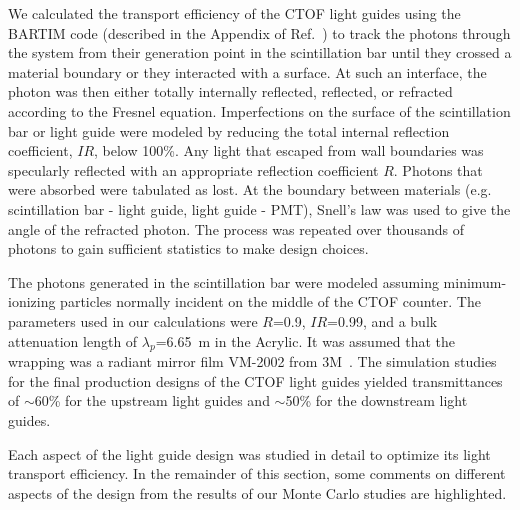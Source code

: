 \documentclass{elsart}
\begin{document}
We calculated the transport efficiency of the CTOF light guides using the BARTIM code
(described in the Appendix of Ref.~\cite{mutch}) to track the photons through the system
from their generation point in the scintillation bar until they crossed a material boundary
or they interacted with a surface. At such an interface, the photon was then either totally 
internally reflected, reflected, or refracted according to the Fresnel equation. Imperfections 
on the surface of the scintillation bar or light guide were modeled by reducing the total 
internal reflection coefficient, $IR$, below 100\%. Any light that escaped from wall boundaries 
was specularly reflected with an appropriate reflection coefficient $R$. Photons that were 
absorbed were tabulated as lost. At the boundary between materials (e.g. scintillation bar - 
light guide, light guide - PMT), Snell's law was used to give the angle of the refracted 
photon. The process was repeated over thousands of photons to gain sufficient statistics to 
make design choices.

The photons generated in the scintillation bar were modeled assuming minimum-ionizing
particles normally incident on the middle of the CTOF counter. The parameters used in our 
calculations were $R$=0.9, $IR$=0.99, and a bulk attenuation length of $\lambda_p$=6.65~m 
in the Acrylic. It was assumed that the wrapping was a radiant mirror film VM-2002 from 
3M~\cite{3m-ref}. The simulation studies for the final production designs of the CTOF light
guides yielded transmittances of $\sim$60\% for the upstream light guides and $\sim$50\%
for the downstream light guides.

Each aspect of the light guide design was studied in detail to optimize its light transport 
efficiency. In the remainder of this section, some comments on different aspects of the 
design from the results of our Monte Carlo studies are highlighted.
\end{document}
